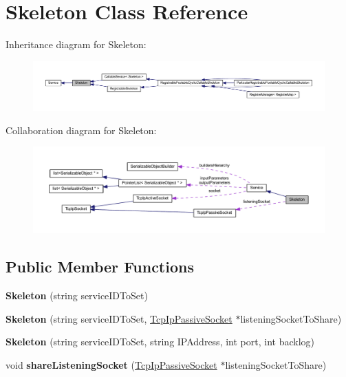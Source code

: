 \hypertarget{class_skeleton}{
\section{Skeleton Class Reference}
\label{class_skeleton}
}


Inheritance diagram for Skeleton:\nopagebreak
\begin{figure}[H]
\begin{center}
\leavevmode
\includegraphics[width=400pt]{class_skeleton__inherit__graph}
\end{center}
\end{figure}


Collaboration diagram for Skeleton:\nopagebreak
\begin{figure}[H]
\begin{center}
\leavevmode
\includegraphics[width=400pt]{class_skeleton__coll__graph}
\end{center}
\end{figure}
\subsection*{Public Member Functions}
\begin{DoxyCompactItemize}
\item 
\hypertarget{class_skeleton_a8758c6676828d80f99a7bc8cb6c4c836}{
{\bfseries Skeleton} (string serviceIDToSet)}
\label{class_skeleton_a8758c6676828d80f99a7bc8cb6c4c836}

\item 
\hypertarget{class_skeleton_a724b77f83f1461c95fc2b3def5e26400}{
{\bfseries Skeleton} (string serviceIDToSet, \hyperlink{class_tcp_ip_passive_socket}{TcpIpPassiveSocket} $\ast$listeningSocketToShare)}
\label{class_skeleton_a724b77f83f1461c95fc2b3def5e26400}

\item 
\hypertarget{class_skeleton_a6205920dbd84d42b00c8552280d1f13a}{
{\bfseries Skeleton} (string serviceIDToSet, string IPAddress, int port, int backlog)}
\label{class_skeleton_a6205920dbd84d42b00c8552280d1f13a}

\item 
\hypertarget{class_skeleton_ad51826bee524a8e2cd0afb54d855240e}{
void {\bfseries shareListeningSocket} (\hyperlink{class_tcp_ip_passive_socket}{TcpIpPassiveSocket} $\ast$listeningSocketToShare)}
\label{class_skeleton_ad51826bee524a8e2cd0afb54d855240e}

\end{DoxyCompactItemize}
